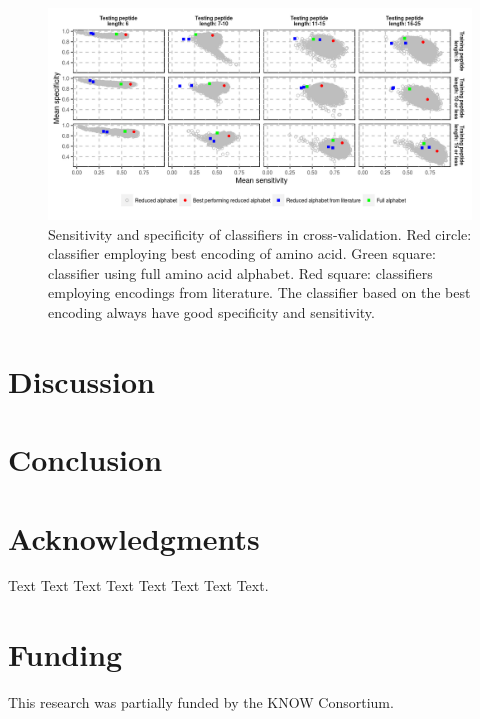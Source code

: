 \documentclass{bioinfo}
\begin{document}
\begin{figure}[!tpb]
\centerline{\includegraphics{figures/sesp_plot.png}}
\caption{Sensitivity and specificity of classifiers in cross-validation. Red circle: classifier employing best encoding of amino acid. Green square: classifier using full amino acid alphabet. Red square: classifiers employing encodings from literature. The classifier based on the best encoding always have good specificity and sensitivity.}\label{fig:sesp_plot}
\end{figure}


\section{Discussion}









%
%






\section{Conclusion}



\section*{Acknowledgments}

Text Text Text Text Text Text  Text Text. 

\section*{Funding}

This research was partially funded by the KNOW Consortium.


%
%
%
%
%
%
%

\end{document}
